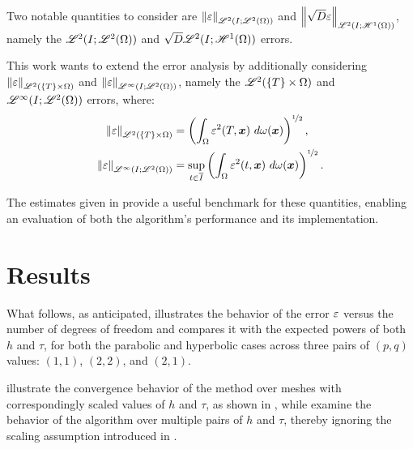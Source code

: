 Two notable quantities to consider are $\left\lVert \varepsilon \right\rVert_{\mathscr{L}^{2}(I; \mathscr{L}^{2}(\Omega))}$ and $\left\lVert \sqrt{D} \varepsilon \right\rVert_{\mathscr{L}^{2}(I; \mathscr{H}^{1}(\Omega))}$, namely the $\mathscr{L}^{2}(I; \mathscr{L}^{2}(\Omega))$ and $\sqrt{D} \mathscr{L}^{2}(I; \mathscr{H}^{1}(\Omega))$ errors.

This work wants to extend the error analysis by additionally considering $\left\lVert \varepsilon \right\rVert_{\mathscr{L}^{2}(\left\{ T \right\} \times \Omega)}$ and $\left\lVert \varepsilon \right\rVert_{\mathscr{L}^{\infty}(I; \mathscr{L}^{2}(\Omega))}$, namely the $\mathscr{L}^{2}(\left\{ T \right\} \times \Omega)$ and $\mathscr{L}^{\infty}(I; \mathscr{L}^{2}(\Omega))$ errors, where:
\begin{align}
    \left\lVert \varepsilon \right\rVert_{\mathscr{L}^{2}(\left\{ T \right\} \times \Omega)} &= \left( \int_{\Omega} \varepsilon^2(T, \bm{x}) ~ d \omega (\bm{x}) \right)^{\nicefrac12}, \label{eq:T_error} \\
    \left\lVert \varepsilon \right\rVert_{\mathscr{L}^{\infty}(I; \mathscr{L}^{2}(\Omega))} &= \sup_{t \in \overline{I}} \left( \int_{\Omega} \varepsilon^2(t, \bm{x}) ~ d \omega (\bm{x}) \right)^{\nicefrac12}. \label{eq:inf_error}
\end{align}

The estimates given in  provide a useful benchmark for these quantities, enabling an evaluation of both the algorithm's performance and its implementation.

\newpage
\section{Results} \label{sec:test_results}

What follows, as anticipated, illustrates the behavior of the error $\varepsilon$ versus the number of degrees of freedom and compares it with the expected powers of both $h$ and $\tau$, for both the parabolic and hyperbolic cases across three pairs of $\left( p, q \right)$ values: $\left( 1, 1 \right)$, $\left( 2, 2 \right)$, and $\left( 2, 1 \right)$.

 illustrate the convergence behavior of the method over meshes with correspondingly scaled values of $h$ and $\tau$, as shown in , while  examine the behavior of the algorithm over multiple pairs of $h$ and $\tau$, thereby ignoring the scaling assumption introduced in .

